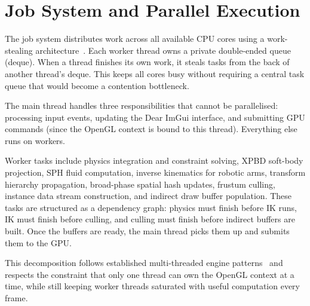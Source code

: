 \documentclass[9pt,openany]{extbook}
\begin{document}
\section{Job System and Parallel Execution}

The job system distributes work across all available CPU cores using a work-stealing architecture~\cite{chase_lev_2005,arora1998}. Each worker thread owns a private double-ended queue (deque). When a thread finishes its own work, it steals tasks from the back of another thread's deque. This keeps all cores busy without requiring a central task queue that would become a contention bottleneck.

The main thread handles three responsibilities that cannot be parallelised: processing input events, updating the Dear ImGui interface, and submitting GPU commands (since the OpenGL context is bound to this thread). Everything else runs on workers.

Worker tasks include physics integration and constraint solving, XPBD soft-body projection, SPH fluid computation, inverse kinematics for robotic arms, transform hierarchy propagation, broad-phase spatial hash updates, frustum culling, instance data stream construction, and indirect draw buffer population. These tasks are structured as a dependency graph: physics must finish before IK runs, IK must finish before culling, and culling must finish before indirect buffers are built. Once the buffers are ready, the main thread picks them up and submits them to the GPU.

This decomposition follows established multi-threaded engine patterns~\cite{ue_threaded_rendering} and respects the constraint that only one thread can own the OpenGL context at a time, while still keeping worker threads saturated with useful computation every frame.
\end{document}
